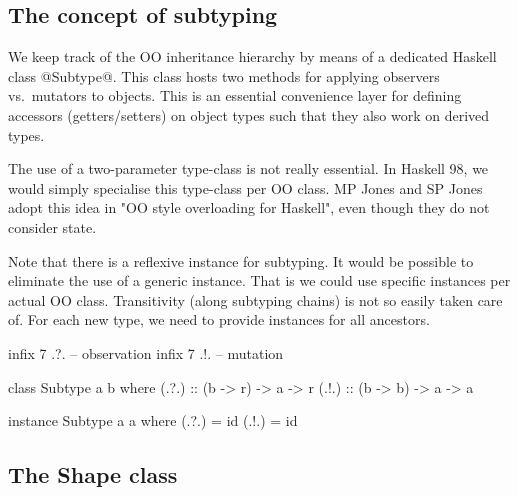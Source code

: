 


\medskip

\subsection{The concept of subtyping} 

We keep track of the OO inheritance hierarchy by means of a dedicated
Haskell class @Subtype@. This class hosts two methods for applying
observers vs.\ mutators to objects. This is an essential convenience
layer for defining accessors (getters/setters) on object types such
that they also work on derived types.

The use of a two-parameter type-class is not really essential.  In
Haskell 98, we would simply specialise this type-class per OO class.
MP Jones and SP Jones adopt this idea in "OO style overloading for
Haskell", even though they do not consider state.

Note that there is a reflexive instance for subtyping. It would be
possible to eliminate the use of a generic instance.  That is we could
use specific instances per actual OO class.  Transitivity (along
subtyping chains) is not so easily taken care of. For each new type,
we need to provide instances for all ancestors.


\begin{code}
infix 7 .?. -- observation
infix 7 .!. -- mutation

class Subtype a b where
 (.?.) :: (b -> r) -> a -> r
 (.!.) :: (b -> b) -> a -> a

instance Subtype a a where
 (.?.) = id
 (.!.) = id
\end{code}






\medskip

\subsection{The Shape class}

